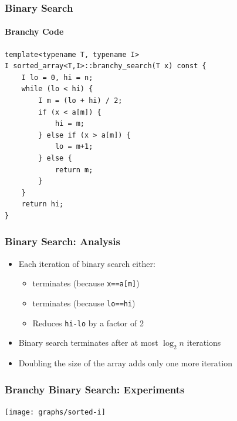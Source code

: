\documentclass[xcolor=dvipsnames]{beamer}
\begin{document}
\begin{frame}[fragile]
  \frametitle{Binary Search}
  \framesubtitle{Branchy Code}

{\small
\begin{verbatim}
template<typename T, typename I>
I sorted_array<T,I>::branchy_search(T x) const {
    I lo = 0, hi = n;
    while (lo < hi) {
        I m = (lo + hi) / 2;
        if (x < a[m]) {
            hi = m;
        } else if (x > a[m]) {
            lo = m+1;
        } else {
            return m;
        }
    }
    return hi;
}
\end{verbatim}
}
\end{frame}

\begin{frame}[fragile]
  \frametitle{Binary Search: Analysis}

  \begin{itemize}
    \item<+->Each iteration of binary search either:
    \begin{itemize}
      \item<+->terminates (because \texttt{x==a[m]})
      \item<+->terminates (because \texttt{lo==hi})
      \item<+->Reduces \texttt{hi-lo} by a factor of 2
    \end{itemize}
    \item<+->Binary search terminates after at most $\log_2 n$ iterations
    \item<+->Doubling the size of the array adds only one more iteration
  \end{itemize}
\end{frame}

\begin{frame}
  \frametitle{Branchy Binary Search: Experiments}
  \begin{center}
    \texttt{[image: graphs/sorted-i]}
  \end{center}
\end{frame}
\end{document}
